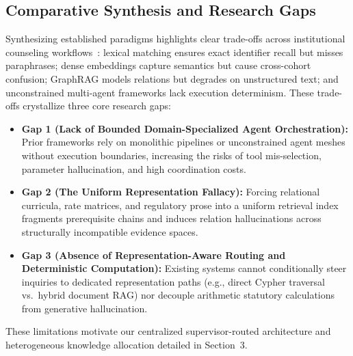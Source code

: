 \subsection{Comparative Synthesis and Research Gaps}
\label{sec:gaps}

Synthesizing established paradigms highlights clear trade-offs across institutional counseling workflows~\cite{cormack2009rrf,edge2024graphrag,jeong2024adaptiverag,karpukhin2020dpr,robertson2009bm25,schick2023toolformer,wu2023autogen,yao2023react}: lexical matching ensures exact identifier recall but misses paraphrases; dense embeddings capture semantics but cause cross-cohort confusion; GraphRAG models relations but degrades on unstructured text; and unconstrained multi-agent frameworks lack execution determinism. These trade-offs crystallize three core research gaps:

\begin{itemize}
    \item \textbf{Gap 1 (Lack of Bounded Domain-Specialized Agent Orchestration):} Prior frameworks rely on monolithic pipelines or unconstrained agent meshes without execution boundaries, increasing the risks of tool mis-selection, parameter hallucination, and high coordination costs.
    
    \item \textbf{Gap 2 (The Uniform Representation Fallacy):} Forcing relational curricula, rate matrices, and regulatory prose into a uniform retrieval index fragments prerequisite chains and induces relation hallucinations across structurally incompatible evidence spaces.
    
    \item \textbf{Gap 3 (Absence of Representation-Aware Routing and Deterministic Computation):} Existing systems cannot conditionally steer inquiries to dedicated representation paths (e.g., direct Cypher traversal vs.\ hybrid document RAG) nor decouple arithmetic statutory calculations from generative hallucination.
\end{itemize}

These limitations motivate our centralized supervisor-routed architecture and heterogeneous knowledge allocation detailed in Section~3.

